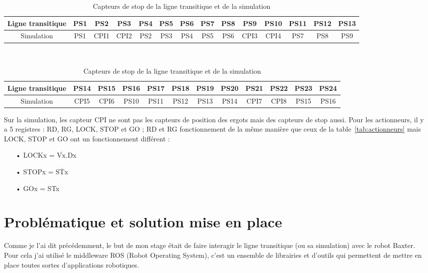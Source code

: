 \documentclass[a4paper,french, titlepage]{book}
\begin{document}
\begin{table}[H]

 	  
\begin{center}
	\begin{tabular}{|c||c|c|c|c|c|c|c|c|c|c|c|c|c|}
	\hline Ligne transitique   &PS1&PS2&PS3&PS4&PS5&PS6&PS7&PS8&PS9&PS10&PS11&PS12&PS13\\
	\hline Simulation   &PS1&CPI1&CPI2&PS2&PS3&PS4&PS5&PS6&CPI3&CPI4&PS7&PS8&PS9\\
	\hline
	\end{tabular} 
	\\[0.7cm]
	\begin{tabular}{|c||c|c|c|c|c|c|c|c|c|c|c|}
	\hline Ligne transitique   &PS14&PS15&PS16&PS17&PS18&PS19&PS20&PS21&PS22&PS23&PS24\\
	\hline Simulation   &CPI5&CPI6&PS10&PS11&PS12&PS13&PS14&CPI7&CPI8&PS15&PS16\\
	\hline
	\end{tabular}       
\end{center}
\caption{\label{tab:capteur_simu}Capteurs de stop de la ligne transitique et de la simulation}
\end{table}

\newpage
Sur la simulation, les capteur CPI ne sont pas les capteurs de position des ergots mais des capteurs de stop aussi. Pour les actionneurs, il y a 5 registres : RD, RG, LOCK, STOP et GO ; RD et RG fonctionnement de la même manière que ceux de la table~\ref{tab:actionneurs} mais LOCK, STOP et GO ont un fonctionnement différent :

\begin{itemize}
\item[ ]
\item[•] LOCKx = $\overline{\text{Vx}}$.Dx
\item[•] STOPx = $\overline{\text{STx}}$
\item[•] GOx = STx
\item[ ]
\end{itemize}




\section{Problématique et solution mise en place}

Comme je l'ai dit précédemment, le but de mon stage était de faire interagir le ligne transitique (ou sa simulation) avec le robot Baxter. Pour cela j'ai utilisé le middleware ROS (Robot Operating System), c'est un ensemble de librairies et d'outils qui permettent de mettre en place toutes sortes d'applications robotiques.\\
\end{document}
